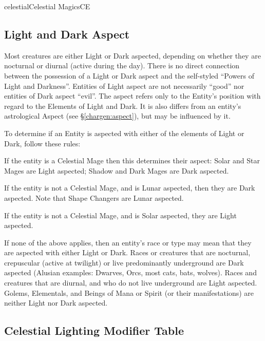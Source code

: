 \begin{college}[1.3]{celestial}{Celestial Magics}{CE}
\subsection{Light and Dark Aspect}
\label{celestial:aspect}

Most creatures are either Light or Dark aspected, depending on whether they are 
nocturnal or diurnal (active during the day). There is no direct connection between 
the possession of a Light or Dark aspect and the self-styled ``Powers of Light and 
Darkness''. Entities of Light aspect are not necessarily ``good'' nor entities of Dark 
aspect ``evil''. The aspect refers only to the Entity's position with regard to the 
Elements of Light and Dark. It is also differs from an entity's astrological Aspect 
(see \S\ref{chargen:aspect}), but may be influenced by it.

To determine if an Entity is aspected with either of the elements of Light or Dark, 
follow these rules:
\begin{Itemize}
\item If the entity is a Celestial Mage then this determines their
aspect: Solar and Star Mages are Light aspected; Shadow and Dark Mages
are Dark aspected.

\item If the entity is not a Celestial Mage, and is Lunar aspected,
then they are Dark aspected. Note that Shape Changers are Lunar
aspected.

\item If the entity is not a Celestial Mage, and is Solar aspected,
they are Light aspected.

\item If none of the above applies, then an entity's race or type may
mean that they are aspected with either Light or Dark. Races or
creatures that are nocturnal, crepuscular (active at twilight) or live
predominantly underground are Dark aspected (Alusian examples:
Dwarves, Orcs, most cats, bats, wolves). Races and creatures that are
diurnal, and who do not live underground are Light aspected. Golems,
Elementals, and Beings of Mana or Spirit (or their manifestations) are
neither Light nor Dark aspected.
\end{Itemize}

\begin{table*}
\subsection{Celestial Lighting Modifier Table}
\label{table-lighting}


\end{table*}
\end{college}
